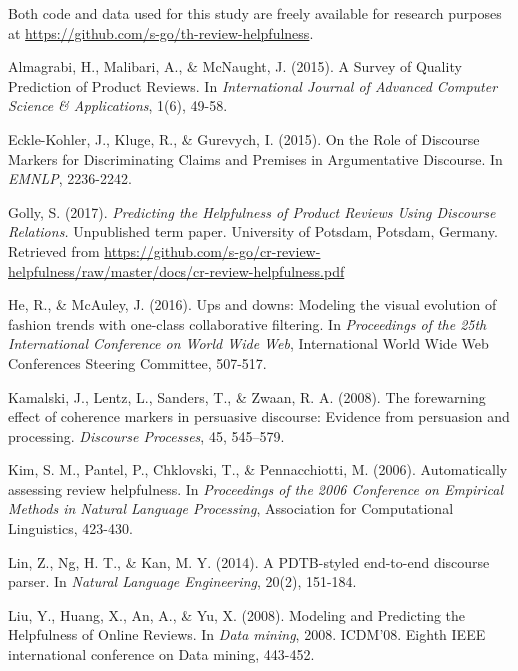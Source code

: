 \documentclass[
    a4paper,%
    12pt,%
    oneside,%
    toc=bibliography,
    final,
]{scrartcl}
\begin{document}
\vfill


\begin{center}
Both code and data used for this study are freely available for research purposes at \url{https://github.com/s-go/th-review-helpfulness}.
\end{center}

\newpage
\begin{thebibliography}{9}

 Almagrabi, H., Malibari, A., \& McNaught, J. (2015). A Survey of Quality Prediction of Product Reviews. In \textit{International Journal of Advanced Computer Science \& Applications}, 1(6), 49-58.

 Eckle-Kohler, J., Kluge, R., \& Gurevych, I. (2015). On the Role of Discourse Markers for Discriminating Claims and Premises in Argumentative Discourse. In \textit{EMNLP}, 2236-2242.

 Golly, S. (2017). \textit{Predicting the Helpfulness of Product Reviews Using Discourse Relations.} Unpublished term paper. University of Potsdam, Potsdam, Germany. Retrieved from \url{https://github.com/s-go/cr-review-helpfulness/raw/master/docs/cr-review-helpfulness.pdf}

 He, R., \& McAuley, J. (2016). Ups and downs: Modeling the visual evolution of fashion trends with one-class collaborative filtering. In \textit{Proceedings of the 25th International Conference on World Wide Web}, International World Wide Web Conferences Steering Committee, 507-517.

 Kamalski, J., Lentz, L., Sanders, T., \& Zwaan, R. A. (2008). The forewarning effect of coherence markers in persuasive discourse: Evidence from persuasion and processing. \textit{Discourse Processes}, 45, 545–579.

 Kim, S. M., Pantel, P., Chklovski, T., \& Pennacchiotti, M. (2006). Automatically assessing review helpfulness. In \textit{Proceedings of the 2006 Conference on Empirical Methods in Natural Language Processing}, Association for Computational Linguistics, 423-430.

 Lin, Z., Ng, H. T., \& Kan, M. Y. (2014). A PDTB-styled end-to-end discourse parser. In \textit{Natural Language Engineering}, 20(2), 151-184.

 Liu, Y., Huang, X., An, A., \& Yu, X. (2008). Modeling and Predicting the Helpfulness of Online Reviews. In \textit{Data mining}, 2008. ICDM'08. Eighth IEEE international conference on Data mining, 443-452.


\end{thebibliography}
\end{document}
